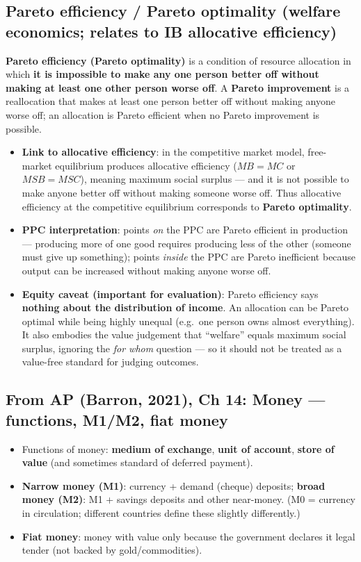 \documentclass[a4paper,12pt]{article}
\newcommand{\needbold}[1]{\textcolor{red!70!black}{\textbf{#1}}}
\begin{document}
\subsection*{Pareto efficiency / Pareto optimality (welfare economics; relates to IB allocative efficiency)}\label{sec:add-pareto}
\needbold{Pareto efficiency (Pareto optimality)} is a condition of resource allocation in which \textbf{it is impossible to make any one person better off without making at least one other person worse off}. A \needbold{Pareto improvement} is a reallocation that makes at least one person better off without making anyone worse off; an allocation is Pareto efficient when no Pareto improvement is possible.
\begin{itemize}
  \item \textbf{Link to allocative efficiency}: in the competitive market model, free-market equilibrium produces allocative efficiency ($MB = MC$ or $MSB = MSC$), meaning maximum social surplus --- and it is not possible to make anyone better off without making someone worse off. Thus allocative efficiency at the competitive equilibrium corresponds to \textbf{Pareto optimality}.
  \item \textbf{PPC interpretation}: points \textit{on} the PPC are Pareto efficient in production --- producing more of one good requires producing less of the other (someone must give up something); points \textit{inside} the PPC are Pareto inefficient because output can be increased without making anyone worse off.
  \item \textbf{Equity caveat (important for evaluation)}: Pareto efficiency says \textbf{nothing about the distribution of income}. An allocation can be Pareto optimal while being highly unequal (e.g.\ one person owns almost everything). It also embodies the value judgement that ``welfare'' equals maximum social surplus, ignoring the \textit{for whom} question --- so it should not be treated as a value-free standard for judging outcomes.
\end{itemize}

\subsection*{From AP (Barron, 2021), Ch 14: Money --- functions, M1/M2, fiat money}\label{sec:add-money}
\begin{itemize}
  \item Functions of money: \textbf{medium of exchange}, \textbf{unit of account}, \textbf{store of value} (and sometimes standard of deferred payment).
  \item \needbold{Narrow money (M1)}: currency + demand (cheque) deposits; \needbold{broad money (M2)}: M1 + savings deposits and other near-money. (M0 = currency in circulation; different countries define these slightly differently.)
  \item \needbold{Fiat money}: money with value only because the government declares it legal tender (not backed by gold/commodities).
\end{itemize}
\end{document}
